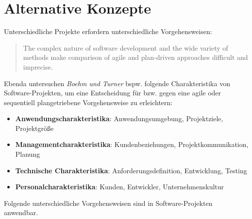 \section{Alternative Konzepte}

\noindent
Unterschiedliche Projekte erfordern unterschiedliche Vorgehensweisen:

\blockquote[{\cite[25]{BT04}}]{
    The complex nature of software development and the wide variety of
    methods make comparison of agile and plan-driven approaches difficult
    and imprecise.
}

Ebenda untersuchen \textit{Boehm und Turner} bspw. folgende Charakteristika von Software-Projekten, um eine Entscheidung für bzw. gegen eine agile oder sequentiell plangetriebene Vorgehensweise zu erleichtern:

\begin{itemize}
    \item \textbf{Anwendungscharakteristika}: Anwendungsumgebung, Projektziele, Projektgröße
    \item \textbf{Managementcharakteristika}: Kundenbeziehungen, Projektkommunikation, Planung
    \item \textbf{Technische Charakteristika}: Anforderungsdefinition, Entwicklung, Testing
    \item \textbf{Personalcharakteristika}: Kunden, Entwickler, Unternehmenskultur
\end{itemize}

\noindent
Folgende unterschiedliche Vorgehensweisen sind in Software-Projekten anwendbar.




